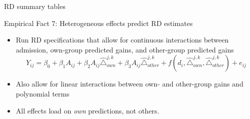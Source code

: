 \documentclass[table,10pt]{beamer}
\begin{document}
\begin{frame}{RD summary tables}

\begin{center}
\begin{scriptsize}

\end{scriptsize}
\end{center}
\end{frame}
%
%
%
%
%
%
%

\begin{frame}{Empirical Fact 7: Heterogeneous effects predict RD estimates}


\begin{itemize}
\item<1>  Run RD specifications that allow for continuous interactions between admission, own-group predicted gains, and other-group predicted gains
$$
Y_{ij}=\beta_0+\beta_1A_{ij}+\beta_2  A_{ij}   \hat{\triangle}_{own}^{j,k} +\beta_3  A_{ij}  \hat{\triangle}_{other}^{j,k}+f(d_i,\hat{\triangle}_{own}^{j,k}, \hat{\triangle}_{other}^{j,k})+e_{ij}
$$
\item<1> Also allow for linear interactions between own- and other-group gains and polynomial terms
\item<1> All effects load on \emph{own} predictions, not others.
\end{itemize}

\end{frame}
\end{document}
